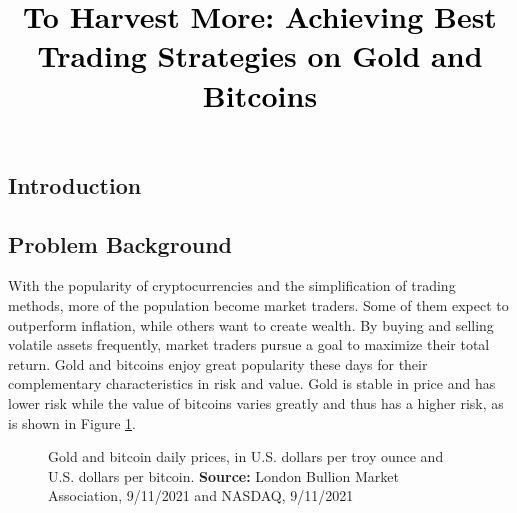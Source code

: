 \documentclass[12pt,a4paper]{article}
\newcommand{\PaperTitle}{To Harvest More: Achieving Best Trading Strategies on Gold and Bitcoins}  %
\begin{document}
\thispagestyle{empty}


\newpage

\title{
\Large{\textcolor{black}{\PaperTitle}}
}




\maketitle



\tableofcontents
\setcounter{tocdepth}{2}

\newpage
\setcounter{page}{1}


\begin{spacing}{1.2} 



\section{Introduction}
\label{Problem_Statement}

\subsection{Problem Background}
With the popularity of cryptocurrencies and the simplification of trading methods, more of the population become market traders. Some of them expect to outperform inflation, while others want to create wealth. By buying and selling volatile assets frequently, market traders pursue a goal to maximize their total return. Gold and bitcoins enjoy great popularity these days for their complementary characteristics in risk and value. Gold is stable in price and has lower risk while the value of bitcoins varies greatly and thus has a higher risk, as is shown in Figure \ref{figure:prices2in1}.

\begin{figure}[H]
	\caption{Gold and bitcoin daily prices, in U.S. dollars per troy ounce and U.S. dollars per bitcoin. \textbf{Source:} London Bullion Market 
		Association, 9/11/2021 and NASDAQ, 9/11/2021 }
	\label{figure:prices2in1}
\end{figure}


\end{spacing}
\end{document}
